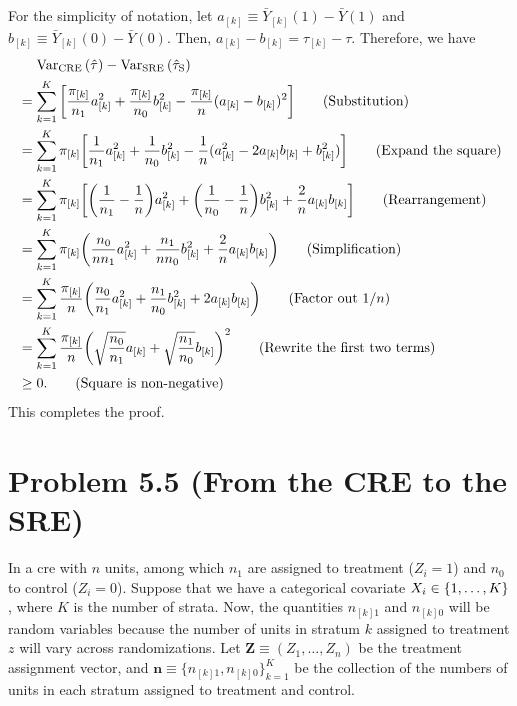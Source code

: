 \documentclass[10pt]{article}
\begin{document}
For the simplicity of notation,
let $a_{[k]} \equiv \bar{Y}_{[k]}(1) - \bar{Y}(1)$
and
$b_{[k]} \equiv \bar{Y}_{[k]}(0) - \bar{Y}(0)$.
Then, $a_{[k]} - b_{[k]} = \tau_{[k]} - \tau$.
Therefore, we have
\begin{align*}
  &\mathrel{\phantom{=}} \operatorname{Var}_{\text{CRE}}{\left( \hat{\tau} \right)} - \operatorname{Var}_{\text{SRE}}{\left( \hat{\tau}_\text{S} \right)} \\
  &= \sum_{k=1}^K {\left[ 
    \frac{\pi_{[k]}}{n_1} a_{[k]}^2 
    + \frac{\pi_{[k]}}{n_0} b_{[k]}^2
    - \frac{\pi_{[k]}}{n} (a_{[k]} - b_{[k]})^2
   \right]} \tag{Substitution} \\
  &= \sum_{k=1}^K \pi_{[k]} {\left[ 
    \frac{1}{n_1} a_{[k]}^2 
    + \frac{1}{n_0} b_{[k]}^2
    - \frac{1}{n} (a_{[k]}^2 - 2 a_{[k]} b_{[k]} + b_{[k]}^2)
   \right]} \tag{Expand the square} \\
  &= \sum_{k=1}^K \pi_{[k]} {\left[ 
    {\left( \frac{1}{n_1} - \frac{1}{n} \right)} a_{[k]}^2 
    + {\left( \frac{1}{n_0} - \frac{1}{n} \right)} b_{[k]}^2
    + \frac{2}{n} a_{[k]} b_{[k]}
   \right]} \tag{Rearrangement} \\
  &= \sum_{k=1}^K \pi_{[k]} {\left( 
    \frac{n_0}{n n_1} a_{[k]}^2 
    + \frac{n_1}{n n_0} b_{[k]}^2
    + \frac{2}{n} a_{[k]} b_{[k]}
   \right)} \tag{Simplification} \\
  &= \sum_{k=1}^K \frac{\pi_{[k]}}{n} {\left( 
    \frac{n_0}{n_1} a_{[k]}^2 
    + \frac{n_1}{n_0} b_{[k]}^2
    + 2 a_{[k]} b_{[k]}
   \right)} \tag{Factor out $1/n$} \\
  &= \sum_{k=1}^K \frac{\pi_{[k]}}{n} {\left( 
    \sqrt{\frac{n_0}{n_1}} a_{[k]}
    + \sqrt{\frac{n_1}{n_0}} b_{[k]}
   \right)}^2 \tag{Rewrite the first two terms} \\
  &\geq 0. \tag{Square is non-negative}
\end{align*}
This completes the proof.

\section*{Problem 5.5 (From the CRE to the SRE)}

In a \gls{cre} with $n$ units,
among which $n_1$ are assigned to treatment ($Z_i = 1$)
and $n_0$ to control ($Z_i = 0$).
Suppose that we have a categorical covariate $X_i \in {\left\lbrace 1, \ldots, K \right\rbrace}$,
where $K$ is the number of strata.
Now, the quantities $n_{[k]1}$ and $n_{[k]0}$ will be random variables
because the number of units in stratum $k$ assigned to treatment $z$
will vary across randomizations.
Let $\mathbf{Z} \equiv (Z_1, \ldots, Z_n)$ be the treatment assignment vector,
and $\mathbf{n} \equiv \{n_{[k]1}, n_{[k]0}\}_{k=1}^K$ be the collection of 
the numbers of units in each stratum assigned to treatment and control.
\end{document}
